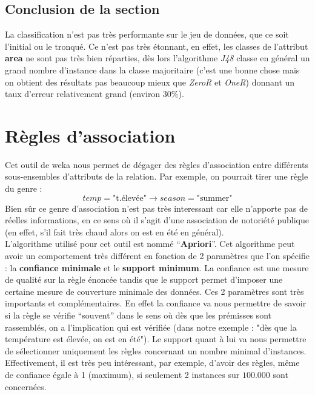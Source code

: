 \documentclass{article}
\begin{document}
\begin{sffamily}
\subsection{Conclusion de la section}

La classification n'est pas très performante sur le jeu de données, que ce soit l'initial ou le tronqué. Ce n'est pas très étonnant, en effet, les
classes de l'attribut \textbf{area} ne sont pas très bien réparties, dès lors l'algorithme \textit{J48} classe en général un grand nombre d'instance 
dans la classe majoritaire (c'est une bonne chose mais on obtient des résultats pas beaucoup mieux que \textit{ZeroR} et \textit{OneR}) donnant un
taux d'erreur relativement grand (environ $30\%$).

\section{Règles d'association}

Cet outil de weka nous permet de dégager des règles d'association entre différents sous-ensembles d'attributs de la relation. Par 
exemple, on pourrait tirer une règle du genre : $$temp=\text{"t.élevée"} \rightarrow season=\text{"summer"}$$ Bien sûr ce 
genre d'association n'est pas très interessant car elle n'apporte pas de réelles informations, en ce sens où il s'agit d'une 
association de notoriété publique (en effet, s'il fait très chaud alors on est en été en général). \\

L'algorithme utilisé pour cet outil est nommé ``\textbf{Apriori}''. Cet algorithme peut avoir un comportement très différent en 
fonction de 2 paramètres que l'on spécifie : la \textbf{confiance minimale} et le \textbf{support minimum}. La confiance est une 
mesure de qualité sur la règle énoncée tandis que le support permet d'imposer une certaine mesure de couverture minimale des 
données. Ces 2 paramètres sont très importants et complémentaires. En effet la confiance va nous permettre de savoir si la règle 
se vérifie ``souvent'' dans le sens où dès que les prémisses sont rassemblés, on a l'implication qui est vérifiée (dans notre 
exemple : "dès que la température est élevée, on est en été"). Le support quant à lui va nous permettre de sélectionner 
uniquement les règles concernant un nombre minimal d'instances. Effectivement, il est très peu intéressant, par exemple, d'avoir 
des règles, même de confiance égale à 1 (maximum), si seulement 2 instances sur $100.000$ sont concernées.\\


\end{sffamily}
\end{document}
